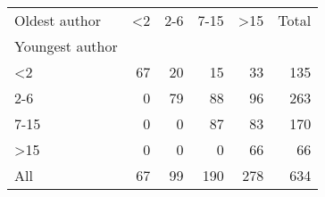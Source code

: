 \begin{tabular}{lrrrrr}
Oldest author & <2 & 2-6 & 7-15 & >15 & Total \\
Youngest author &  &  &  &  &  \\
<2 & 67 & 20 & 15 & 33 & 135 \\
2-6 & 0 & 79 & 88 & 96 & 263 \\
7-15 & 0 & 0 & 87 & 83 & 170 \\
>15 & 0 & 0 & 0 & 66 & 66 \\
All & 67 & 99 & 190 & 278 & 634 \\
\end{tabular}
